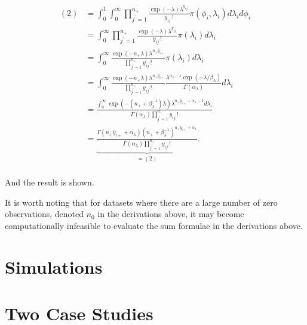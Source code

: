 \documentclass{article}
\begin{document}
 \begin{align*}
 (2) &= \int_0^1\int_0^\infty\prod_{j^\prime=1}^{n_+}\frac{\exp{(-\lambda)}\lambda^{y_{ij^\prime}} }{y_{ij^\prime}!}\pi(\phi_i,\lambda_i )d\lambda_id\phi_i \\
 &= \int_0^\infty \prod_{j^\prime=1}^{n_+}\frac{\exp{(-\lambda)}\lambda^{y_{ij^\prime}} }{y_{ij^\prime}!}\pi(\lambda_i )d\lambda_i \\
 &= \int_0^\infty\frac{\exp{(-n_+\lambda)}\lambda^{n_+\bar{y}_{i+}} }{\prod_{j^\prime=1}^{n_+}y_{ij^\prime}!}\pi(\lambda_i )d\lambda_i \\
 &= \int_0^\infty\frac{\exp{(-n_+\lambda)}\lambda^{n_+\bar{y}_{i+}} }{\prod_{j^\prime=1}^{n_+}y_{ij^\prime}!}\frac{\lambda^{\alpha_{\lambda}-1}\exp{(-\lambda/\beta_{\lambda})}}{\Gamma(\alpha_{\lambda})}d\lambda_i \\
 &= \frac{\int_0^\infty\exp{(-(n_+ +\beta_{\lambda}^{-1})\lambda)}\lambda^{n_+\bar{y}_{i+} +\alpha_{\lambda}-1} d\lambda_i}{\Gamma(\alpha_{\lambda})\prod_{j^\prime=1}^{n_+}y_{ij^\prime}!} \\
 &= \underbrace{\frac{\Gamma(n_+\bar{y}_{i+}+\alpha_{\lambda})(n_+ +\beta_{\lambda}^{-1})^{n_+\bar{y}_{i+}+\alpha_{\lambda}}}{\Gamma(\alpha_{\lambda})\prod_{j^\prime=1}^{n_+}y_{ij^\prime}!}}_{=(2)}. \\
 \end{align*}
 
 And the result is shown. 
 
 It is worth noting that for datasets where there are a large number of zero observations, denoted $n_0$ in the derivations above, it may become computationally infeasible to evaluate the sum formulae in the derivations above. 

\section{Simulations}
\label{sec:simulations}

\section{Two Case Studies}
\label{sec:twocasestudies}
\end{document}
